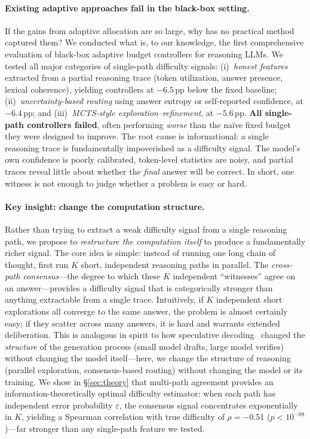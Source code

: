 \paragraph{Existing adaptive approaches fail in the black-box setting.}
If the gains from adaptive allocation are so large, why has no practical method captured them?
We conducted what is, to our knowledge, the first comprehensive evaluation of black-box adaptive budget controllers for reasoning LLMs.
We tested all major categories of single-path difficulty signals:
(i)~\emph{honest features} extracted from a partial reasoning trace (token utilization, answer presence, lexical coherence), yielding controllers at $-6.5$\,pp below the fixed baseline;
(ii)~\emph{uncertainty-based routing} using answer entropy or self-reported confidence, at $-6.4$\,pp;
and (iii)~\emph{MCTS-style exploration--refinement}, at $-5.6$\,pp.
\textbf{All single-path controllers failed}, often performing \emph{worse} than the na\"ive fixed budget they were designed to improve.
The root cause is informational: a single reasoning trace is fundamentally impoverished as a difficulty signal.
The model's own confidence is poorly calibrated, token-level statistics are noisy, and partial traces reveal little about whether the \emph{final} answer will be correct.
In short, one witness is not enough to judge whether a problem is easy or hard.

\paragraph{Key insight: change the computation structure.}
Rather than trying to extract a weak difficulty signal from a single reasoning path, we propose to \emph{restructure the computation itself} to produce a fundamentally richer signal.
The core idea is simple: instead of running one long chain of thought, first run $K$ short, independent reasoning paths in parallel.
The \emph{cross-path consensus}---the degree to which these $K$ independent ``witnesses'' agree on an answer---provides a difficulty signal that is categorically stronger than anything extractable from a single trace.
Intuitively, if $K$ independent short explorations all converge to the same answer, the problem is almost certainly easy; if they scatter across many answers, it is hard and warrants extended deliberation.
This is analogous in spirit to how speculative decoding~\cite{leviathan2023fast} changed the \emph{structure} of the generation process (small model drafts, large model verifies) without changing the model itself---here, we change the structure of reasoning (parallel exploration, consensus-based routing) without changing the model or its training.
We show in \S\ref{sec:theory} that multi-path agreement provides an information-theoretically optimal difficulty estimator: when each path has independent error probability $\varepsilon$, the consensus signal concentrates exponentially in $K$, yielding a Spearman correlation with true difficulty of $\rho = -0.51$ ($p < 10^{-88}$)---far stronger than any single-path feature we tested.

